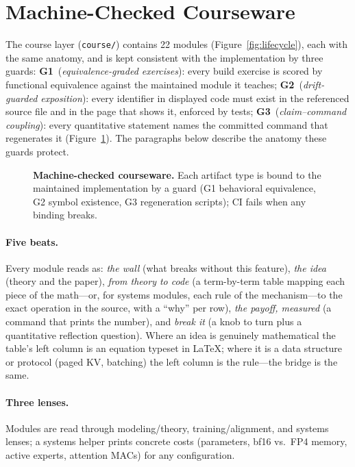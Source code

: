 \section{Machine-Checked Courseware}
\label{sec:course}

The course layer (\texttt{course/}) contains 22 modules
(Figure~\ref{fig:lifecycle}), each with the same anatomy, and is kept
consistent with the implementation by three guards:
\textbf{G1}~(\emph{equivalence-graded exercises}): every build exercise is
scored by functional equivalence against the maintained module it teaches;
\textbf{G2}~(\emph{drift-guarded exposition}): every identifier in displayed
code must exist in the referenced source file and in the page that shows it,
enforced by tests; \textbf{G3}~(\emph{claim--command coupling}): every
quantitative statement names the committed command that regenerates it
(Figure~\ref{fig:guards}). The paragraphs below describe the anatomy these
guards protect.

\begin{figure}[t]
  \centering
  \resizebox{\columnwidth}{!}{}
  \caption{\textbf{Machine-checked courseware.} Each artifact type is bound
  to the maintained implementation by a guard (G1 behavioral equivalence, G2
  symbol existence, G3 regeneration scripts); CI fails when any binding
  breaks.}
  \label{fig:guards}
\end{figure}

\paragraph{Five beats.} Every module reads as: \emph{the wall} (what breaks
without this feature), \emph{the idea} (theory and the paper), \emph{from
theory to code} (a term-by-term table mapping each piece of the math---or,
for systems modules, each rule of the mechanism---to the exact operation in
the source, with a ``why'' per row), \emph{the payoff, measured} (a command
that prints the number), and \emph{break it} (a knob to turn plus a
quantitative reflection question). Where an idea is genuinely mathematical the
table's left column is an equation typeset in \LaTeX{}; where it is a data
structure or protocol (paged KV, batching) the left column is the rule---the
bridge is the same.

\paragraph{Three lenses.} Modules are read through modeling/theory,
training/alignment, and systems lenses; a systems helper prints concrete
costs (parameters, bf16 vs.\ FP4 memory, active experts, attention MACs) for
any configuration.

